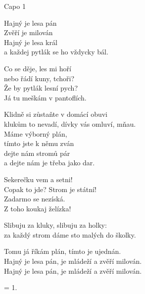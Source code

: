 
\re{}Capo 1

\ve
{}Hajný je lesa pán\\
Zvěří je milován\\
Hajný je lesa král\\
a každej pytlák se ho vždycky bál.

\re{}
Co se děje, les mi hoří\\
nebo řádí kuny, tchoři?\\
Že by pytlák lesní pych?\\
Já tu meškám v pantoflích.

\re{}
Klidně si zůstaňte v domácí obuvi\\
klukům to nevadí, dívky vás omluví, mňau.\\

\ve{}
Máme výborný plán, \\
tímto jste k němu zván\\
dejte nám stromů pár\\
a dejte nám je třeba jako dar.

\re{}
Sekerečku vem a setni! \\
Copak to jde? Strom je státní!\\
Zadarmo se nezíská.\\
Z toho koukaj želízka!

\re{}
Slibuju za kluky, slibuju za holky:\\
za každý strom dáme sto malých do školky.

\ve
Tomu já říkám plán, tímto je ujednán.\\
Hajný je lesa pán, je mládeží a zvěří milován.\\
Hajný je lesa pán, je mládeží a zvěří milován.

\ve = 1.
\esong